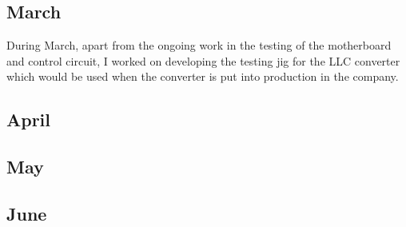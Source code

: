 \subsection{March}
During March, apart from the ongoing work in the testing of the motherboard and
control circuit, I worked on developing the testing jig for the LLC converter
which would be used when the converter is put into production in the company.

\subsection{April}

\subsection{May}

\subsection{June}
